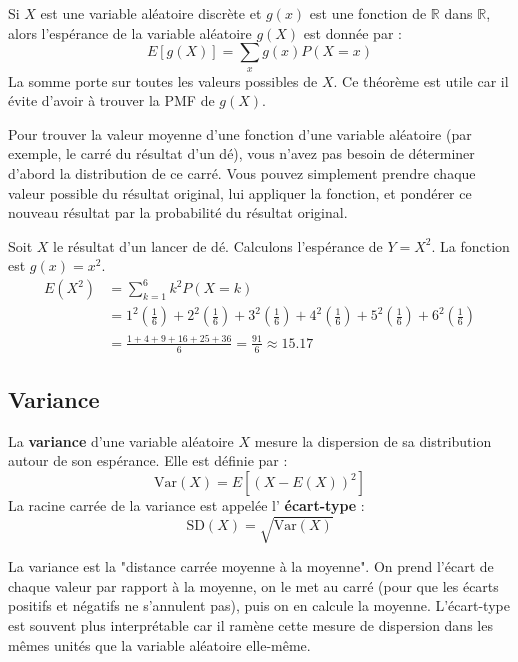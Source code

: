 \begin{theorembox}
Si $X$ est une variable aléatoire discrète et $g(x)$ est une fonction de $\mathbb{R}$ dans $\mathbb{R}$, alors l'espérance de la variable aléatoire $g(X)$ est donnée par :
$$ E[g(X)] = \sum_x g(x) P(X=x) $$
La somme porte sur toutes les valeurs possibles de $X$. Ce théorème est utile car il évite d'avoir à trouver la PMF de $g(X)$.
\end{theorembox}

\begin{intuitionbox}
Pour trouver la valeur moyenne d'une fonction d'une variable aléatoire (par exemple, le carré du résultat d'un dé), vous n'avez pas besoin de déterminer d'abord la distribution de ce carré. Vous pouvez simplement prendre chaque valeur possible du résultat original, lui appliquer la fonction, et pondérer ce nouveau résultat par la probabilité du résultat original.
\end{intuitionbox}

\begin{examplebox}
Soit $X$ le résultat d'un lancer de dé. Calculons l'espérance de $Y=X^2$. La fonction est $g(x)=x^2$.
\begin{align*}
E(X^2) &= \sum_{k=1}^6 k^2 P(X=k) \\
&= 1^2\left(\frac{1}{6}\right) + 2^2\left(\frac{1}{6}\right) + 3^2\left(\frac{1}{6}\right) + 4^2\left(\frac{1}{6}\right) + 5^2\left(\frac{1}{6}\right) + 6^2\left(\frac{1}{6}\right) \\
&= \frac{1+4+9+16+25+36}{6} = \frac{91}{6} \approx 15.17
\end{align*}
\end{examplebox}

\subsection{Variance}

\begin{definitionbox}
La \textbf{variance} d'une variable aléatoire $X$ mesure la dispersion de sa distribution autour de son espérance. Elle est définie par :
$$ \text{Var}(X) = E\left[ (X - E(X))^2 \right] $$
La racine carrée de la variance est appelée l' \textbf{écart-type} :
$$ \text{SD}(X) = \sqrt{\text{Var}(X)} $$
\end{definitionbox}

\begin{intuitionbox}
La variance est la "distance carrée moyenne à la moyenne". On prend l'écart de chaque valeur par rapport à la moyenne, on le met au carré (pour que les écarts positifs et négatifs ne s'annulent pas), puis on en calcule la moyenne. L'écart-type est souvent plus interprétable car il ramène cette mesure de dispersion dans les mêmes unités que la variable aléatoire elle-même.
\end{intuitionbox}

